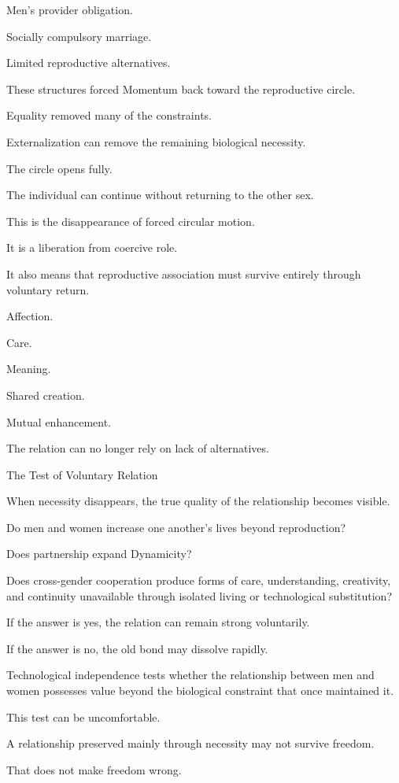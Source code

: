 Men’s provider obligation.

Socially compulsory marriage.

Limited reproductive alternatives.

These structures forced Momentum back toward the reproductive circle.

Equality removed many of the constraints.

Externalization can remove the remaining biological necessity.

The circle opens fully.

The individual can continue without returning to the other sex.

This is the disappearance of forced circular motion.

It is a liberation from coercive role.

It also means that reproductive association must survive entirely through voluntary return.

Affection.

Care.

Meaning.

Shared creation.

Mutual enhancement.

The relation can no longer rely on lack of alternatives.

The Test of Voluntary Relation

When necessity disappears, the true quality of the relationship becomes visible.

Do men and women increase one another’s lives beyond reproduction?

Does partnership expand Dynamicity?

Does cross-gender cooperation produce forms of care, understanding, creativity, and continuity unavailable through isolated living or technological substitution?

If the answer is yes, the relation can remain strong voluntarily.

If the answer is no, the old bond may dissolve rapidly.

Technological independence tests whether the relationship between men and women possesses value beyond the biological constraint that once maintained it.

This test can be uncomfortable.

A relationship preserved mainly through necessity may not survive freedom.

That does not make freedom wrong.

